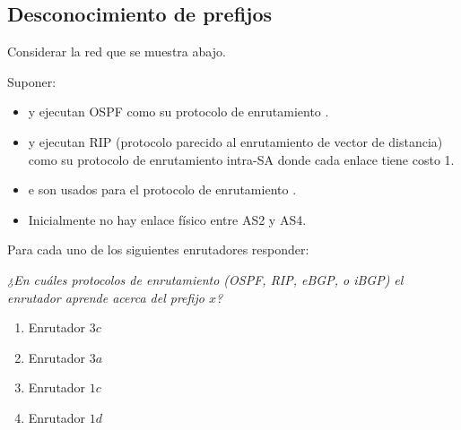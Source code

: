 \documentclass[12pt]{report}
\begin{document}
\begin{exer}
	\subsection{Desconocimiento de prefijos \sthree}

	Considerar la red que se muestra abajo.

	Suponer:
	\begin{itemize}
		\item {} y  ejecutan OSPF como su protocolo de enrutamiento .
		\item {} y  ejecutan RIP (protocolo parecido al enrutamiento de vector de distancia) como su protocolo de enrutamiento intra-SA donde cada enlace tiene costo 1.
		\item {} e  son usados para el protocolo de enrutamiento .
		\item Inicialmente no hay enlace físico entre AS2 y AS4.
	\end{itemize}


	Para cada uno de los siguientes enrutadores responder:

	\emph{¿En cuáles protocolos de enrutamiento (OSPF, RIP, eBGP, o iBGP) el enrutador aprende acerca del prefijo $x$?}

	\begin{enumerate}
		\item Enrutador $3c$
		\item Enrutador $3a$
		\item Enrutador $1c$
		\item Enrutador $1d$
	\end{enumerate}
\end{exer}
\end{document}
